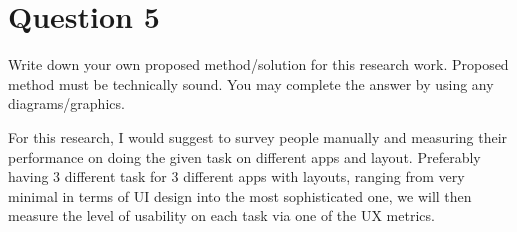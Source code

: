 \documentclass[
  11pt, %
]{assignment}
\begin{document}
\section*{Question 5}
\begin{problem}
Write down your own proposed method/solution for this research work. Proposed method must be technically sound. You may complete the answer by using any diagrams/graphics.
\end{problem}

For this research, I would suggest to survey people manually and measuring their performance on doing the given task on different apps and layout. Preferably having 3 different task for 3 different apps with layouts, ranging from very minimal in terms of UI design into the most sophisticated one, we will then measure the level of usability on each task via one of the UX metrics.


\printbibliography{}
\end{document}
